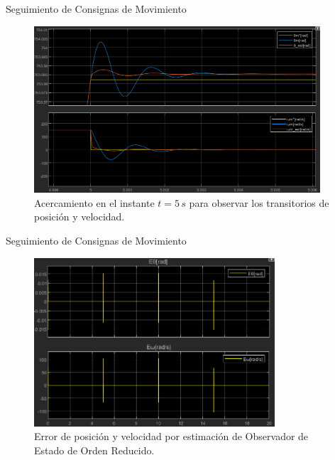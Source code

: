 \documentclass[12pt]{beamer}
\begin{document}
\begin{frame}{Seguimiento de Consignas de Movimiento}
    \begin{figure}[h]
    \centering
    \includegraphics[width=0.95\textwidth]{Imagenes/AcercamientoRespuestaSimulacionCompleta.png}
    \caption{Acercamiento en el instante \(t = 5\,s\) para observar los transitorios de posición y velocidad.}
\end{figure}
\end{frame}

\begin{frame}{Seguimiento de Consignas de Movimiento}
    \begin{figure}[h]
    \centering
    \includegraphics[width=0.8\textwidth]{Imagenes/ErroresObservadorSimulacionCompleta.png}
    \caption{Error de posición y velocidad por estimación de Observador de Estado de Orden Reducido.}
\end{figure}
\end{frame}
\end{document}
